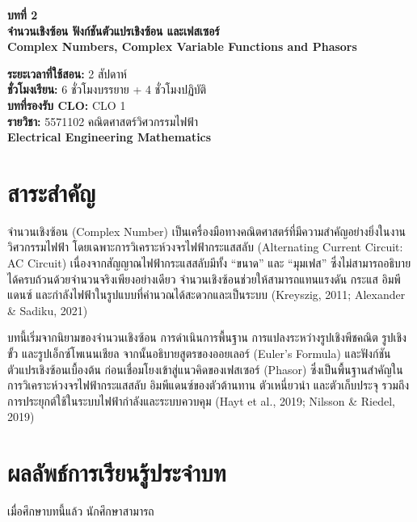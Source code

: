 
\begin{center}
{\LARGE\bfseries บทที่ 2}\\[0.5em]
{\LARGE\bfseries จำนวนเชิงซ้อน ฟังก์ชันตัวแปรเชิงซ้อน และเฟสเซอร์}\\[0.25em]
{\large\bfseries Complex Numbers, Complex Variable Functions and Phasors}
\end{center}

\noindent\textbf{ระยะเวลาที่ใช้สอน:} 2 สัปดาห์\\
\textbf{ชั่วโมงเรียน:} 6 ชั่วโมงบรรยาย + 4 ชั่วโมงปฏิบัติ\\
\textbf{บทที่รองรับ CLO:} CLO 1\\
\textbf{รายวิชา:} 5571102 คณิตศาสตร์วิศวกรรมไฟฟ้า\\
\textbf{Electrical Engineering Mathematics}

\section{สาระสำคัญ}

จำนวนเชิงซ้อน (Complex Number) เป็นเครื่องมือทางคณิตศาสตร์ที่มีความสำคัญอย่างยิ่งในงานวิศวกรรมไฟฟ้า โดยเฉพาะการวิเคราะห์วงจรไฟฟ้ากระแสสลับ (Alternating Current Circuit: AC Circuit) เนื่องจากสัญญาณไฟฟ้ากระแสสลับมีทั้ง “ขนาด” และ “มุมเฟส” ซึ่งไม่สามารถอธิบายได้ครบถ้วนด้วยจำนวนจริงเพียงอย่างเดียว จำนวนเชิงซ้อนช่วยให้สามารถแทนแรงดัน กระแส อิมพีแดนซ์ และกำลังไฟฟ้าในรูปแบบที่คำนวณได้สะดวกและเป็นระบบ (Kreyszig, 2011; Alexander \& Sadiku, 2021)

บทนี้เริ่มจากนิยามของจำนวนเชิงซ้อน การดำเนินการพื้นฐาน การแปลงระหว่างรูปเชิงพีชคณิต รูปเชิงขั้ว และรูปเอ็กซ์โพเนนเชียล จากนั้นอธิบายสูตรของออยเลอร์ (Euler’s Formula) และฟังก์ชันตัวแปรเชิงซ้อนเบื้องต้น ก่อนเชื่อมโยงเข้าสู่แนวคิดของเฟสเซอร์ (Phasor) ซึ่งเป็นพื้นฐานสำคัญในการวิเคราะห์วงจรไฟฟ้ากระแสสลับ อิมพีแดนซ์ของตัวต้านทาน ตัวเหนี่ยวนำ และตัวเก็บประจุ รวมถึงการประยุกต์ใช้ในระบบไฟฟ้ากำลังและระบบควบคุม (Hayt et al., 2019; Nilsson \& Riedel, 2019)

\section{ผลลัพธ์การเรียนรู้ประจำบท}

เมื่อศึกษาบทนี้แล้ว นักศึกษาสามารถ

